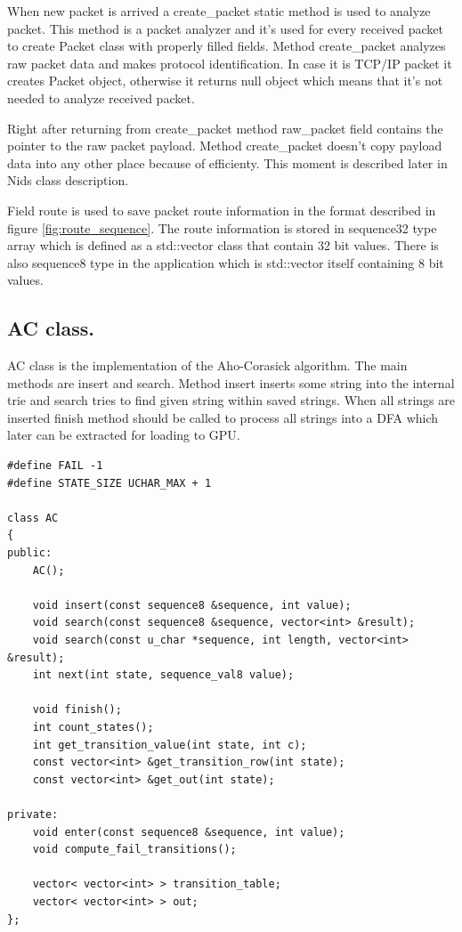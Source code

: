 \documentclass[thesis=M,english]{FITthesis}[2011/07/15]
\begin{document}
When new packet is arrived a create\_packet static method is used to analyze packet. This method is a packet analyzer and it's used for every received packet to create Packet class with properly filled fields. Method create\_packet analyzes raw packet data and makes protocol identification. In case it is TCP/IP packet it creates Packet object, otherwise it returns null object which means that it's not needed to analyze received packet.

Right after returning from create\_packet method raw\_packet field contains the pointer to the raw packet payload. Method create\_packet doesn't copy payload data into any other place because of efficienty. This moment is described later in Nids class description.

Field route is used to save packet route information in the format described in figure \ref{fig:route_sequence}. The route information is stored in sequence32 type array which is defined as a std::vector class that contain 32 bit values. There is also sequence8 type in the application which is std::vector itself containing 8 bit values.

\subsection{AC class.}
AC class is the implementation of the Aho-Corasick algorithm. The main methods are insert and search. Method insert inserts some string into the internal trie and search tries to find given string within saved strings. When all strings are inserted finish method should be called to process all strings into a DFA which later can be extracted for loading to GPU. 

\begin{lstlisting}
#define FAIL -1
#define STATE_SIZE UCHAR_MAX + 1

class AC
{
public:
    AC();

    void insert(const sequence8 &sequence, int value);
    void search(const sequence8 &sequence, vector<int> &result);
    void search(const u_char *sequence, int length, vector<int> &result);
    int next(int state, sequence_val8 value);

    void finish();
    int count_states();
    int get_transition_value(int state, int c);
    const vector<int> &get_transition_row(int state);
    const vector<int> &get_out(int state);

private:
    void enter(const sequence8 &sequence, int value);
    void compute_fail_transitions();

    vector< vector<int> > transition_table;
    vector< vector<int> > out;
};
\end{lstlisting}
\end{document}
